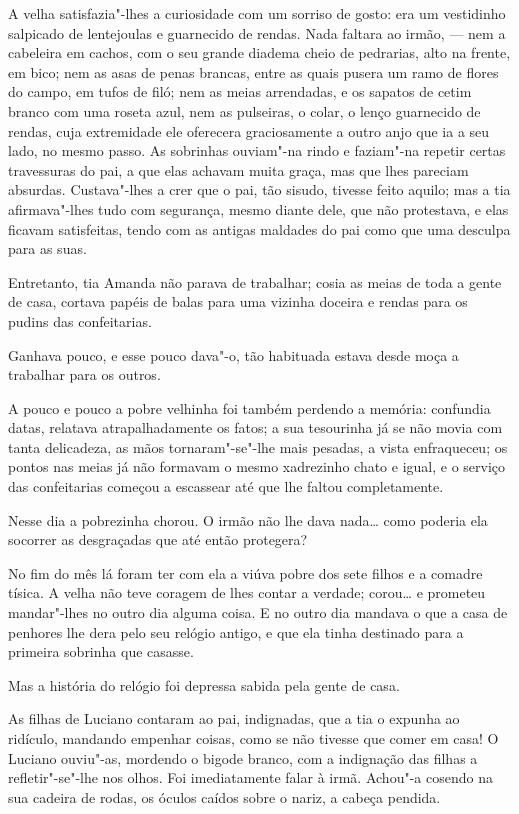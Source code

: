 A velha satisfazia"-lhes a curiosidade com um sorriso de gosto: era um
vestidinho salpicado de lentejoulas e guarnecido de rendas. Nada faltara
ao irmão, --- nem a cabeleira em cachos, com o seu grande diadema cheio
de pedrarias, alto na frente, em bico; nem as asas de penas brancas,
entre as quais pusera um ramo de flores do campo, em tufos de filó; nem
as meias arrendadas, e os sapatos de cetim branco com uma roseta azul,
nem as pulseiras, o colar, o lenço guarnecido de rendas, cuja
extremidade ele oferecera graciosamente a outro anjo que ia a seu lado,
no mesmo passo. As sobrinhas ouviam"-na rindo e faziam"-na repetir certas
travessuras do pai, a que elas achavam muita graça, mas que lhes
pareciam absurdas. Custava"-lhes a crer que o pai, tão sisudo, tivesse
feito aquilo; mas a tia afirmava"-lhes tudo com segurança, mesmo diante
dele, que não protestava, e elas ficavam satisfeitas, tendo com as
antigas maldades do pai como que uma desculpa para as suas.

Entretanto, tia Amanda não parava de trabalhar; cosia as meias de toda a
gente de casa, cortava papéis de balas para uma vizinha doceira e rendas
para os pudins das confeitarias.

Ganhava pouco, e esse pouco dava"-o, tão habituada estava desde moça a
trabalhar para os outros.

A pouco e pouco a pobre velhinha foi também perdendo a memória:
confundia datas, relatava atrapalhadamente os fatos; a sua tesourinha já
se não movia com tanta delicadeza, as mãos tornaram"-se"-lhe mais pesadas,
a vista enfraqueceu; os pontos nas meias já não formavam o mesmo
xadrezinho chato e igual, e o serviço das confeitarias começou a
escassear até que lhe faltou completamente.

Nesse dia a pobrezinha chorou. O irmão não lhe dava nada\ldots{} como poderia
ela socorrer as desgraçadas que até então protegera?

No fim do mês lá foram ter com ela a viúva pobre dos sete filhos e a
comadre tísica. A velha não teve coragem de lhes contar a verdade;
corou\ldots{} e prometeu mandar"-lhes no outro dia alguma coisa. E no outro
dia mandava o que a casa de penhores lhe dera pelo seu relógio antigo, e
que ela tinha destinado para a primeira sobrinha que casasse.

Mas a história do relógio foi depressa sabida pela gente de casa.

As filhas de Luciano contaram ao pai, indignadas, que a tia o expunha ao
ridículo, mandando empenhar coisas, como se não tivesse que comer em
casa! O Luciano ouviu"-as, mordendo o bigode branco, com a indignação das
filhas a refletir"-se"-lhe nos olhos. Foi imediatamente falar à irmã.
Achou"-a cosendo na sua cadeira de rodas, os óculos caídos sobre o nariz,
a cabeça pendida.

